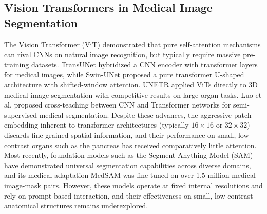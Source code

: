 \documentclass[review,authoryear]{elsarticle}
\begin{document}
\subsection{Vision Transformers in Medical Image Segmentation}
The Vision Transformer (ViT) \cite{dosovitskiy2020image} demonstrated that pure self-attention mechanisms can rival CNNs on natural image recognition, but typically require massive pre-training datasets. TransUNet \cite{transunet} hybridized a CNN encoder with transformer layers for medical images, while Swin-UNet \cite{swinunet} proposed a pure transformer U-shaped architecture with shifted-window attention. UNETR \cite{unetr_ref} applied ViTs directly to 3D medical image segmentation with competitive results on large-organ tasks. Luo et al. \cite{swin_teaching} proposed cross-teaching between CNN and Transformer networks for semi-supervised medical segmentation. Despite these advances, the aggressive patch embedding inherent to transformer architectures (typically $16 \times 16$ or $32 \times 32$) discards fine-grained spatial information, and their performance on small, low-contrast organs such as the pancreas has received comparatively little attention. Most recently, foundation models such as the Segment Anything Model (SAM) \cite{sam} have demonstrated universal segmentation capabilities across diverse domains, and its medical adaptation MedSAM \cite{medsam} was fine-tuned on over 1.5 million medical image-mask pairs. However, these models operate at fixed internal resolutions and rely on prompt-based interaction, and their effectiveness on small, low-contrast anatomical structures remains underexplored.
\end{document}
